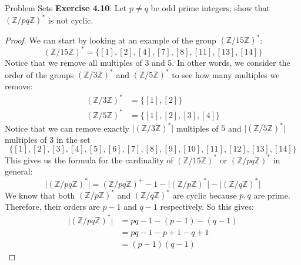 \documentclass{report}
\begin{document}
\begin{exercises}{Problem Sets}
    \textbf{Exercise 4.10}: Let $p \neq q$ be odd prime integers; show that $(\mathbb{Z}/pq\mathbb{Z})^{*}$ is not cyclic.
        \begin{proof}
            We can start by looking at an example of the group $(\mathbb{Z}/15\mathbb{Z})^{*}$:
                \begin{equation*}
                    (\mathbb{Z}/15\mathbb{Z})^{*} = \{[1], [2], [4], [7], [8], [11], [13], [14]\}
                \end{equation*}
            Notice that we remove all multiples of 3 and 5. In other words, we consider the order of the groups $(\mathbb{Z}/3\mathbb{Z})^{*}$ and $(\mathbb{Z}/5\mathbb{Z})^{*}$ to see how many multiples we remove:
                \begin{align*}
                    (\mathbb{Z}/3\mathbb{Z})^{*} &= \{[1], [2]\}                \\
                    (\mathbb{Z}/5\mathbb{Z})^{*} &= \{[1], [2], [3], [4]\}   
                \end{align*}
            Notice that we can remove exactly $\lvert (\mathbb{Z}/3\mathbb{Z})^{*} \rvert$ multiples of $5$ and $\lvert (\mathbb{Z}/5\mathbb{Z})^{*} \rvert$ multiples of $3$ in the set 
                \begin{equation*}
                    \{[1], [2], [3], [4], [5], [6], [7], [8], [9], [10], [11], [12], [13], [14]\}
                \end{equation*}
            This gives us the formula for the cardinality of $(\mathbb{Z}/15\mathbb{Z})^{*}$ or $(\mathbb{Z}/pq\mathbb{Z})^{*}$ in general:
                \begin{equation*}
                    \lvert (\mathbb{Z}/pq\mathbb{Z})^{*} \rvert = (\mathbb{Z}/pq\mathbb{Z})^{+} - 1 - \lvert (\mathbb{Z}/p\mathbb{Z})^{*} \rvert - \lvert (\mathbb{Z}/q\mathbb{Z})^{*} \rvert
                \end{equation*}
            We know that both $(\mathbb{Z}/p\mathbb{Z})^{*}$ and $(\mathbb{Z}/q\mathbb{Z})^{*}$ are cyclic because $p, q$ are prime. Therefore, their orders are $p - 1$ and $q - 1$ respectively. So this gives:
                \begin{align*}
                    \lvert (\mathbb{Z}/pq\mathbb{Z})^{*} \rvert &= pq - 1 - (p - 1) - (q - 1) \\
                                                                &= pq - 1 - p + 1 - q + 1     \\
                                                                &= (p - 1)(q - 1)               

\end{align*}
\end{proof}
\end{exercises}
\end{document}
